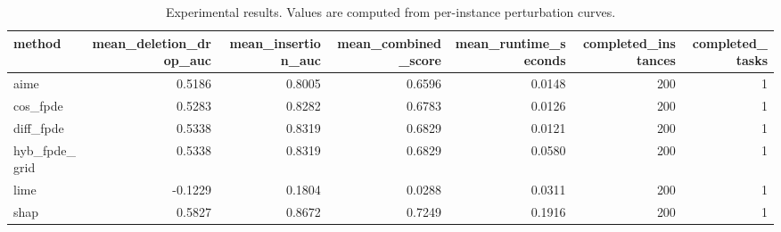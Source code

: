 \begin{table}[t]
\caption{Experimental results. Values are computed from per-instance perturbation curves.}
\label{tab:main_results_computed}
\centering
\begin{tabular}{lrrrrrr}
\toprule
method & mean\_deletion\_drop\_auc & mean\_insertion\_auc & mean\_combined\_score & mean\_runtime\_seconds & completed\_instances & completed\_tasks \\
\midrule
aime & 0.5186 & 0.8005 & 0.6596 & 0.0148 & 200 & 1 \\
cos\_fpde & 0.5283 & 0.8282 & 0.6783 & 0.0126 & 200 & 1 \\
diff\_fpde & 0.5338 & 0.8319 & 0.6829 & 0.0121 & 200 & 1 \\
hyb\_fpde\_grid & 0.5338 & 0.8319 & 0.6829 & 0.0580 & 200 & 1 \\
lime & -0.1229 & 0.1804 & 0.0288 & 0.0311 & 200 & 1 \\
shap & 0.5827 & 0.8672 & 0.7249 & 0.1916 & 200 & 1 \\
\bottomrule
\end{tabular}

\end{table}
